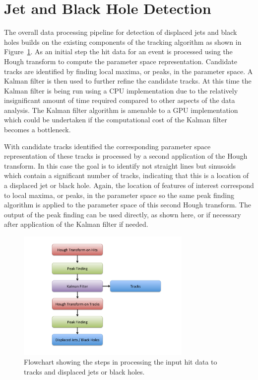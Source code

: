 \documentclass{JINST}
\begin{document}
\section{Jet and Black Hole Detection}

The overall data processing pipeline for detection of displaced jets and black holes builds on the existing components of the tracking algorithm as shown in Figure~\ref{fig:Flowchart}.  As an initial step the hit data for an event is processed using the Hough transform to compute the parameter space representation.  Candidate tracks are identified by finding local maxima, or peaks, in the parameter space.  A Kalman filter is then used to further refine the candidate tracks.  At this time the Kalman filter is being run using a CPU implementation due to the relatively insignificant amount of time required compared to other aspects of the data analysis.  The Kalman filter algorithm is amenable to a GPU implementation which could be undertaken if the computational cost of the Kalman filter becomes a bottleneck.

With candidate tracks identified the corresponding parameter space representation of these tracks is processed by a second application of the Hough transform.  In this case the goal is to identify not straight lines but sinusoids which contain a significant number of tracks, indicating that this is a location of a displaced jet or black hole.  Again, the location of features of interest correspond to local maxima, or peaks, in the parameter space so the same peak finding algorithm is applied to the parameter space of this second Hough transform.  The output of the peak finding can be used directly, as shown here, or if necessary after application of the Kalman filter if needed.

\begin{figure}[!Hhtb]
\begin{center}
\includegraphics[width=0.75\textwidth]{figs/Flowchart.pdf} 
\caption{Flowchart showing the steps in processing the input hit data to tracks and displaced jets or black holes.\label{fig:Flowchart}}
\end{center}
\end{figure}
\end{document}
